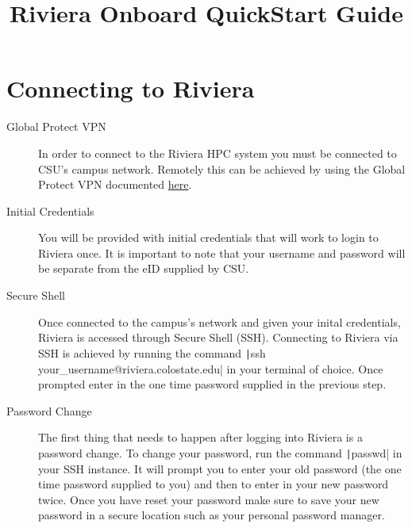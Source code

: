 \documentclass[11pt,letterpaper]{article}
\title{Riviera Onboard QuickStart Guide}
\begin{document}
\startdoc

\section{Connecting to Riviera}

\begin{description}
    \item[Global Protect VPN] In order to connect to the Riviera HPC system you must be connected to CSU's campus network. Remotely this can be achieved by using the Global Protect VPN documented \href{https://csusystem.freshservice.com/support/solutions/folders/23000047198}{here}.
    \item[Initial Credentials] You will be provided with initial credentials that will work to login to Riviera once. It is important to note that your username and password will be separate from the eID supplied by CSU.
    \item[Secure Shell] Once connected to the campus's network and given your inital credentials, Riviera is accessed through Secure Shell (SSH). Connecting to Riviera via SSH is achieved by running the command \texttt|ssh your_username@riviera.colostate.edu| in your terminal of choice. Once prompted enter in the one time password supplied in the previous step.
    \item[Password Change] The first thing that needs to happen after logging into Riviera is a password change. To change your password, run the command \texttt|passwd| in your SSH instance. It will prompt you to enter your old password (the one time password supplied to you) and then to enter in your new password twice. Once you have reset your password make sure to save your new password in a secure location such as your personal password manager.
\end{description}
\end{document}
